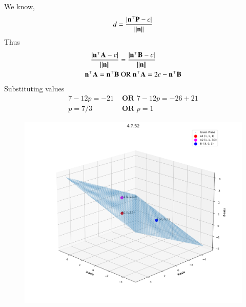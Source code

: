 \documentclass[journal,12pt,onecolumn]{IEEEtran}
\theoremstyle{remark}
\begin{document}
We know,
\begin{align}
 d = \frac{|\mathbf{n}^\top\mathbf{P}-c|}{\left\lVert\mathbf{n}\right\rVert}
\end{align}
Thus
\begin{align}
 \frac{|\mathbf{n}^\top\mathbf{A}-c|}{\left\lVert\mathbf{n}\right\rVert} &= \frac{|\mathbf{n}^\top\mathbf{B}-c|}{\left\lVert\mathbf{n}\right\rVert} \\
 \mathbf{n}^\top\mathbf{A} = \mathbf{n}^\top\mathbf{B} &\text{ OR } \mathbf{n}^\top\mathbf{A} = 2c - \mathbf{n}^\top\mathbf{B}
\end{align}
Substituting values
\begin{align}
7 - 12p = -21 &\textbf{  OR  } 7-12p = -26 + 21 \\
p = 7/3 &\textbf{  OR  } p = 1
\end{align}
\begin{figure}[H]
    \centering
    \includegraphics{figs/plot.png}
    \caption*{}
    \label{fig:plot}
\end{figure}
\end{document}
